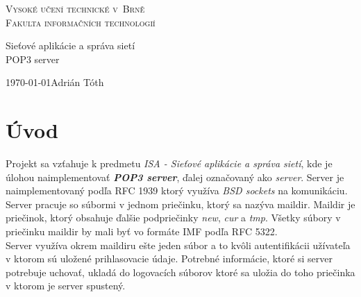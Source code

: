 \documentclass[11pt,a4paper]{article}
\begin{document}

\begin{titlepage}

\begin{center}

	\thispagestyle{empty}

	\textsc {
		\Huge Vysoké učení technické v~Brně\\[0.4em]
		\huge Fakulta informačních technologií
	}\\


	{
		\LARGE Sieťové aplikácie a správa sietí\\[0.4em]
		\Huge POP3 server
	}


\end{center}

	{
		\LARGE \today \hfill Adrián Tóth
	}

\end{titlepage}	

\setlength{\parskip}{0pt}
{\hypersetup{hidelinks}\tableofcontents}
\setlength{\parskip}{0pt}

\newpage %

\section{Úvod}
	\indent Projekt sa vzťahuje k predmetu \textit{ISA - Sieťové aplikácie a správa sietí}, kde je úlohou naimplementovať \textbf{\textit{POP3 server}}, ďalej označovaný ako \textit{server}. Server je naimplementovaný podľa RFC 1939\cite{POP3} ktorý využíva \textit{BSD sockets} na komunikáciu.\\
	\indent Server pracuje so súbormi v jednom priečinku, ktorý sa nazýva maildir. Maildir\cite{MAILDIR} je priečinok, ktorý obsahuje ďalšie podpriečinky \textit{new}, \textit{cur} a \textit{tmp}. Všetky súbory v priečinku maildir by mali byť vo formáte IMF podľa RFC 5322\cite{IMF}.\\
	\indent Server využíva okrem maildiru ešte jeden súbor a to kvôli autentifikácii užívateľa v ktorom sú uložené prihlasovacie údaje. Potrebné informácie, ktoré si server potrebuje uchovať, ukladá do logovacích súborov ktoré sa uložia do toho priečinka v ktorom je server spustený.
\end{document}
